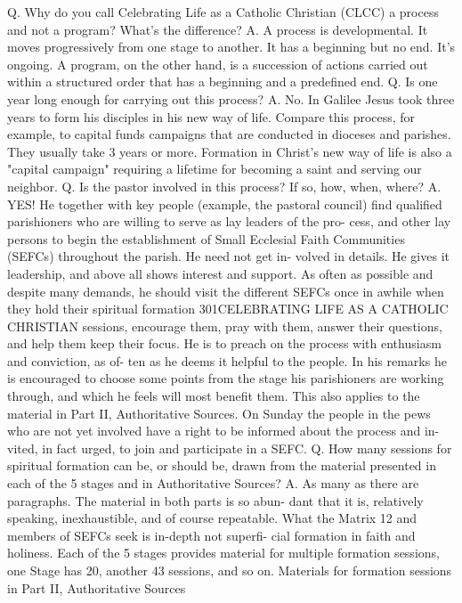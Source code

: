 \documentclass[oneside]{book}
\begin{document}
Q. Why do you call Celebrating Life as a Catholic Christian (CLCC) a process and
not a program? What's the difference?  A. A process is developmental. It moves
progressively from one stage to another. It has a beginning but no end. It's
ongoing. A program, on the other hand, is a succession of actions carried out
within a structured order that has a beginning and a predefined end.  Q. Is one
year long enough for carrying out this process?  A. No. In Galilee Jesus took
three years to form his disciples in his new way of life. Compare this process,
for example, to capital funds campaigns that are conducted in dioceses and
parishes. They usually take 3 years or more. Formation in Christ's new way of
life is also a "capital campaign" requiring a lifetime for becoming a saint and
serving our neighbor.  Q. Is the pastor involved in this process? If so, how,
when, where?  A. YES! He together with key people (example, the pastoral
council) find qualified parishioners who are willing to serve as lay leaders of
the pro- cess, and other lay persons to begin the establishment of Small
Ecclesial Faith Communities (SEFCs) throughout the parish. He need not get in-
volved in details. He gives it leadership, and above all shows interest and
support.  As often as possible and despite many demands, he should visit the
different SEFCs once in awhile when they hold their spiritual formation
301CELEBRATING LIFE AS A CATHOLIC CHRISTIAN sessions, encourage them, pray with
them, answer their questions, and help them keep their focus.  He is to preach
on the process with enthusiasm and conviction, as of- ten as he deems it helpful
to the people. In his remarks he is encouraged to choose some points from the
stage his parishioners are working through, and which he feels will most benefit
them. This also applies to the material in Part II, Authoritative Sources. On
Sunday the people in the pews who are not yet involved have a right to be
informed about the process and in- vited, in fact urged, to join and participate
in a SEFC.  Q. How many sessions for spiritual formation can be, or should be,
drawn from the material presented in each of the 5 stages and in Authoritative
Sources?  A. As many as there are paragraphs. The material in both parts is so
abun- dant that it is, relatively speaking, inexhaustible, and of course
repeatable. What the Matrix 12 and members of SEFCs seek is in-depth not
superfi- cial formation in faith and holiness. Each of the 5 stages provides
material for multiple formation sessions, one Stage has 20, another 43 sessions,
and so on.  Materials for formation sessions in Part II, Authoritative Sources
\end{document}
